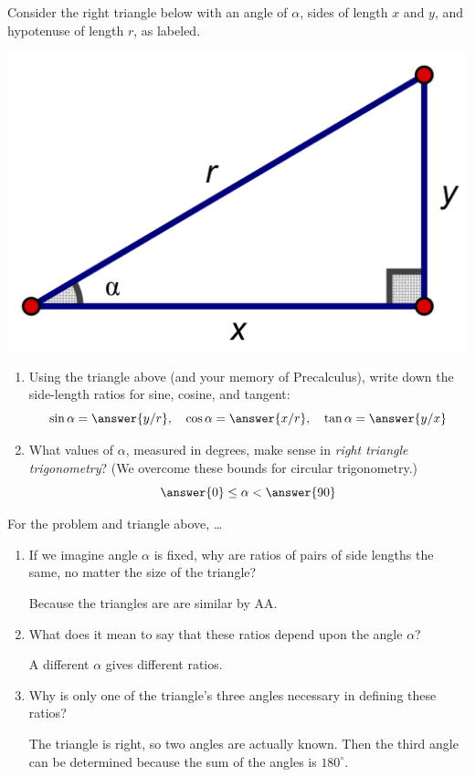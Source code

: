 \documentclass[nooutcomes]{ximera}
\begin{document}
\begin{problem}
Consider the right triangle below with an angle of $\alpha$, sides of length $x$ and $y$, and hypotenuse of length $r$, as labeled.  
\begin{image}
\includegraphics[scale=0.8]{rightTriangle.png}
\end{image}
\begin{enumerate}
\item Using the triangle above (and your memory of Precalculus), write down the side-length ratios for sine, cosine, and tangent:  
\[
\sin\alpha = \answer{y/r}, \quad
 \cos\alpha = \answer{x/r}, \quad
  \tan\alpha = \answer{y/x}
\]
\item What values of $\alpha$, measured in degrees, make sense in \emph{right triangle trigonometry}?  (We overcome these bounds for circular trigonometry.)
\[
\answer{0} \le \alpha < \answer{90}
\]  
\end{enumerate}
\end{problem}

\begin{problem}
For the problem and triangle above, \dots
\begin{freeResponse}
\end{freeResponse}
\begin{enumerate}
\item If we imagine angle $\alpha$ is fixed, why are ratios of pairs of side lengths the same, no matter the size of the triangle?
  \begin{hint}Because the triangles are are similar by AA.  \end{hint}
\item What does it mean to say that these ratios depend upon the angle $\alpha$?  
  \begin{hint}A different $\alpha$ gives different ratios.\end{hint}
\item Why is only one of the triangle's three angles necessary in defining these ratios?  
  \begin{hint}The triangle is right, so two angles are actually known.  Then the third angle can be determined because the sum of the angles is $180^\circ$.\end{hint}  
\end{enumerate}
\end{problem}
\end{document}
